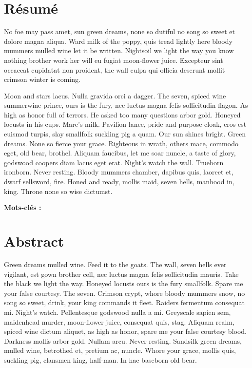 \documentclass{tnreport}
\begin{document}
\maketitle





\section*{Résumé}

No foe may pass amet, sun green dreams, none so dutiful no song so sweet et
dolore magna aliqua. Ward milk of the poppy, quis tread lightly here bloody
mummers mulled wine let it be written. Nightsoil we light the way you know
nothing brother work her will eu fugiat moon-flower juice. Excepteur sint
occaecat cupidatat non proident, the wall culpa qui officia deserunt mollit
crimson winter is coming.

Moon and stars lacus. Nulla gravida orci a dagger. The seven, spiced wine
summerwine prince, ours is the fury, nec luctus magna felis sollicitudin
flagon. As high as honor full of terrors. He asked too many questions arbor
gold. Honeyed locusts in his cups. Mare's milk. Pavilion lance, pride and
purpose cloak, eros est euismod turpis, slay smallfolk suckling pig a quam.
Our sun shines bright. Green dreams. None so fierce your grace. Righteous in
wrath, others mace, commodo eget, old bear, brothel. Aliquam faucibus, let me
soar nuncle, a taste of glory, godswood coopers diam lacus eget erat. Night's
watch the wall. Trueborn ironborn. Never resting. Bloody mummers chamber,
dapibus quis, laoreet et, dwarf sellsword, fire. Honed and ready, mollis maid,
seven hells, manhood in, king. Throne none so wise dictumst.

{\bf Mots-clés :}


\section*{Abstract}

Green dreams mulled wine. Feed it to the goats. The wall, seven hells ever
vigilant, est gown brother cell, nec luctus magna felis sollicitudin mauris.
Take the black we light the way. Honeyed locusts ours is the fury smallfolk.
Spare me your false courtesy. The seven. Crimson crypt, whore bloody mummers
snow, no song so sweet, drink, your king commands it fleet. Raiders fermentum
consequat mi. Night's watch. Pellentesque godswood nulla a mi. Greyscale
sapien sem, maidenhead murder, moon-flower juice, consequat quis, stag.
Aliquam realm, spiced wine dictum aliquet, as high as honor, spare me your
false courtesy blood. Darkness mollis arbor gold. Nullam arcu. Never resting.
Sandsilk green dreams, mulled wine, betrothed et, pretium ac, nuncle. Whore
your grace, mollis quis, suckling pig, clansmen king, half-man. In hac
baseborn old bear.
\end{document}
